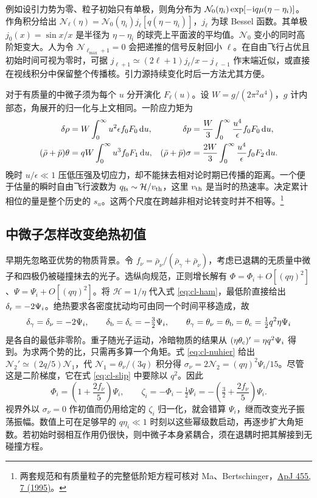 例如设引力势为零、粒子初始只有单极，则角分布为 $\mathcal N_0(\eta_i)\exp[-\mathrm{i} q\mu(\eta-\eta_i)]$。作角积分给出 $\mathcal N_\ell(\eta)=\mathcal N_0(\eta_i)j_\ell[q(\eta-\eta_i)]$，$j_\ell$ 为球 Bessel 函数。其单极 $j_0(x)=\sin x/x$ 是半径为 $\eta-\eta_i$ 的球壳上平面波的平均值。$\mathcal N_0$ 变小的同时高阶矩变大。人为令 $\mathcal N_{\ell_{\max}+1}=0$ 会把递推的信号反射回小 $\ell$。在自由飞行占优且初始时间可视为零时，可据 $j_{\ell+1}\simeq(2\ell+1)j_\ell/x-j_{\ell-1}$ 作末端近似，或直接在视线积分中保留整个传播核。引力源持续变化时后一方法尤其方便。

对于有质量的中微子须为每个 $u$ 分开演化 $F_\ell(u)$。设 $W=g/(2\pi^2a^4)$，$g$ 计内部态，角展开的归一化与上文相同。一阶应力矩为
\begin{align*}
 \delta\rho&=W\int_0^\infty u^2\epsilon f_0 F_0\,\dd u,&
 \delta p&=\frac W3\int_0^\infty\frac{u^4}{\epsilon} f_0 F_0\,\dd u,\\
 (\bar\rho+\bar p)\theta&=qW\int_0^\infty u^3 f_0 F_1\,\dd u,&
 (\bar\rho+\bar p)\sigma&=\frac{2W}{3}\int_0^\infty
                        \frac{u^4}{\epsilon} f_0 F_2\,\dd u .
\end{align*}
晚时 $u/\epsilon\ll1$ 压低压强及切应力，却不能抹去相对论时期已传播的距离。一个便于估量的瞬时自由飞行波数为 $q_{\rm fs}\sim\mathcal H/v_{\rm th}$，这里 $v_{\rm th}$ 是当时的热速率。决定累计相位的量是整个历史的 $s_u$。这两个尺度在跨越非相对论转变时并不相等。\footnote{两套规范和有质量粒子的完整低阶矩方程可核对 Ma、Bertschinger，\href{https://doi.org/10.1086/176550}{ApJ 455, 7 (1995)}。}

\subsection{中微子怎样改变绝热初值}

早期先忽略亚优势的物质背景。令 $f_\nu=\bar\rho_\nu/(\bar\rho_\gamma+\bar\rho_\nu)$，考虑已退耦的无质量中微子和四极仍被碰撞抹去的光子。选纵向规范，正则增长解有 $\Phi=\Phi_i+O[(q\eta)^2]$、$\Psi=\Psi_i+O[(q\eta)^2]$。将 $\mathcal H=1/\eta$ 代入式 \eqref{eq:cl-ham}，最低阶直接给出 $\delta_{\rm r}=-2\Psi_i$。绝热要求各密度扰动均可由同一个时间平移造成，故
\[
 \delta_\gamma=\delta_\nu=-2\Psi_i,\qquad
 \delta_{\rm b}=\delta_{\rm c}=-\tfrac32\Psi_i,\qquad
 \theta_\gamma=\theta_\nu=\theta_{\rm b}=\theta_{\rm c}
                       =\tfrac12 q^2\eta\Psi_i
\]
是各自的最低非零阶。重子随光子运动，冷暗物质的结果从 $(\eta\theta_{\rm c})'=\eta q^2\Psi_i$ 得到。为求两个势的比，只需再多算一个角矩。式 \eqref{eq:cl-nuhier} 给出 $\mathcal N_2'\simeq(2q/5)\mathcal N_1$，代 $\mathcal N_1=\theta_\nu/(3q)$ 积分得 $\sigma_\nu=2\mathcal N_2=(q\eta)^2\Psi_i/15$。尽管这是二阶梯度，它在式 \eqref{eq:cl-slip} 中要除以 $q^2$。因此
\begin{equation}\label{eq:cl-nuic}
 \Phi_i=\left(1+\frac{2f_\nu}{5}\right)\Psi_i,\qquad
 \zeta_i=-\Phi_i-\tfrac12\Psi_i
        =-\left(\tfrac32+\frac{2f_\nu}{5}\right)\Psi_i .
\end{equation}
视界外以 $\sigma_\nu=0$ 作初值而仍用给定的 $\zeta_i$ 归一化，就会错算 $\Psi_i$，继而改变光子振荡振幅。数值上可在足够早的 $q\eta_i\ll1$ 时刻以这些幂级数启动，再逐步扩大角矩数。若初始时弱相互作用仍很快，则中微子本身紧耦合，须在退耦时把其解接到无碰撞方程。

